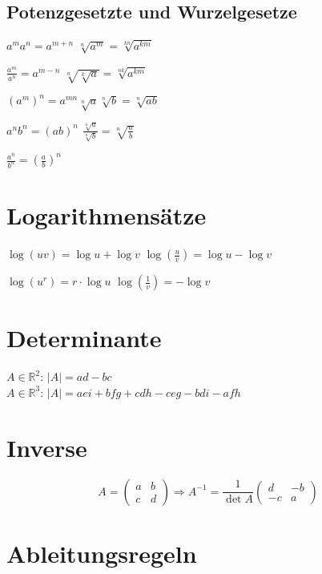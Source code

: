     \subsection{Potenzgesetzte und Wurzelgesetze}
    
	$a^m a^n = a^{m+n}$ \tab $\sqrt[n]{a^m} = \sqrt[kn]{a^{km}}$
	
	\noindent$\frac{a^m}{ a^n} = a^{m-n}$ \tab $\sqrt[n]{\sqrt[k]{a}} = \sqrt[nk]{a^{km}}$
	
	\noindent$(a^m)^n= a^{mn}$\tab $\sqrt[n]{a}\sqrt[n]{b}=\sqrt[n]{ab}$
	
	\noindent$a^n b^n = (ab)^n$ \tab $\frac{\sqrt[n]{a}}{\sqrt[n]{b}}= \sqrt[n]{\frac{a}{b}}$
	
	\noindent$\frac{a^n}{b^n} = (\frac{a}{b})^n$\\


	
    \section{Logarithmensätze}
    
	$\log(uv) = \log u +\log v$ \hspace{0.05cm} $\log(\frac{u}{v}) = \log u -\log v$
	
	\noindent$\log(u^r) = r\cdot \log u$ \tab $\log(\frac{1}{v}) = -\log v$\\
	
	\section{Determinante}
	
	$A\in\mathbb{R}^2$: $|A|=ad-bc$\\
	$A\in\mathbb{R}^3$: $|A|=aei+bfg+cdh-ceg-bdi-afh$
	
	\section{Inverse}
	
	$$A = \begin{pmatrix} 
        a   & b \\
        c   & d
    \end{pmatrix} 
    \Longrightarrow 
    A^{-1} = \frac{1}{\det A} \begin{pmatrix} 
        d   & -b \\
        -c   & a
    \end{pmatrix}$$
    
    \section{Ableitungsregeln}


